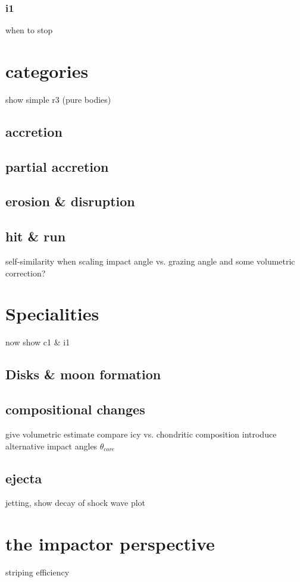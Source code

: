\subsubsection{i1}
when to stop

\section{\SSC categories}
show simple r3 (pure bodies)


\subsection{accretion}
\subsection{partial accretion}
\subsection{erosion \& disruption}
\subsection{hit \& run}


self-similarity when scaling impact angle vs. grazing angle and some volumetric correction?

\section{Specialities}
now show c1 \& i1
\subsection{Disks \& moon formation}

\subsection{compositional changes}
give volumetric estimate
compare icy vs. chondritic composition
introduce alternative impact angles $\theta_{core}$

\subsection{ejecta}
jetting, show decay of shock wave plot

\section{the impactor perspective}
striping efficiency


